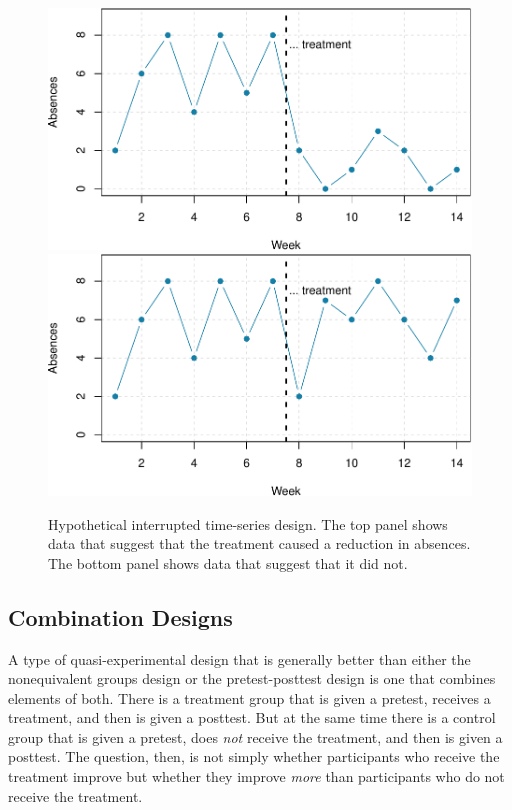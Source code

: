 \documentclass[
]{krantz}
\begin{document}
\begin{figure}

{\centering \includegraphics[width=0.6\linewidth]{09-nonexperiments_files/figure-latex/timeseries-1} \includegraphics[width=0.6\linewidth]{09-nonexperiments_files/figure-latex/timeseries-2} 

}

\caption{Hypothetical interrupted time-series design. The top panel shows data that suggest that the treatment caused a reduction in absences. The bottom panel shows data that suggest that it did not.}\label{fig:timeseries}
\end{figure}

\hypertarget{combination-designs}{%
\subsection*{Combination Designs}\label{combination-designs}}


A type of quasi-experimental design that is generally better than either the nonequivalent groups design or the pretest-posttest design is one that combines elements of both. There is a treatment group that is given a pretest, receives a treatment, and then is given a posttest. But at the same time there is a control group that is given a pretest, does \emph{not} receive the treatment, and then is given a posttest. The question, then, is not simply whether participants who receive the treatment improve but whether they improve \emph{more} than participants who do not receive the treatment.
\end{document}
